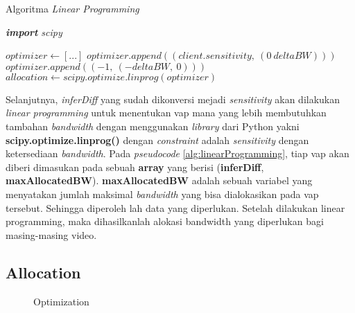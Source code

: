 

        \begin{algorithm}[tbh]
        \caption{Algoritma \textit{Linear Programming}}\label{alg:linearProgramming}
        \textit{\textbf{import} scipy}
        \begin{algorithmic}[1]
        \State $optimizer \gets [...]$
        \State $optimizer.append((client.sensitivity,\ (0\ deltaBW)))$
        \Else 
        \State $optimizer.append((-1,\ (-deltaBW,\ 0)))$
        \EndIf
        \EndFor
        \State $allocation \gets scipy.optimize.linprog(optimizer)$
        \EndProcedure
        \end{algorithmic}
        \end{algorithm}

        Selanjutnya, \textit{inferDiff} yang sudah dikonversi mejadi \textit{sensitivity} akan dilakukan \textit{linear programming} untuk menentukan \gls{vap} mana yang lebih membutuhkan tambahan \textit{bandwidth} dengan menggunakan \textit{library} dari Python yakni
        \textbf{scipy.optimize.linprog()} dengan \textit{constraint} adalah \textit{sensitivity} dengan ketersediaan \textit{bandwidth}. Pada \textit{pseudocode} \ref{alg:linearProgramming}, tiap \gls{vap} akan diberi dimasukan pada sebuah \textbf{array} yang berisi (\textbf{inferDiff}, \textbf{maxAllocatedBW}).
        \textbf{maxAllocatedBW} adalah sebuah variabel yang menyatakan jumlah maksimal \textit{bandwidth} yang bisa dialokasikan pada \gls{vap} tersebut.
        Sehingga diperoleh lah data yang diperlukan. Setelah dilakukan linear programming, maka dihasilkanlah alokasi
        bandwidth yang diperlukan bagi masing-masing video.

    \subsection{Allocation}

        \begin{figure}[tbh]
            \centering
            
            \caption{Optimization}\label{fig:allocation}
        \end{figure} 

